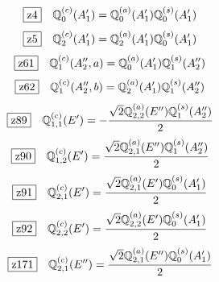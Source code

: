 \documentclass[fleqn,10pt,landscape]{jsarticle}
\begin{document}
\begin{dmath*}
\hspace*{3mm}\fbox{z4}\quad \mathbb{Q}_{0}^{(c)}(A_{1}^{\prime})=\mathbb{Q}_{0}^{(a)}(A_{1}^{\prime}) \mathbb{Q}_{0}^{(s)}(A_{1}^{\prime})
\end{dmath*}
\begin{dmath*}
\hspace*{3mm}\fbox{z5}\quad \mathbb{Q}_{2}^{(c)}(A_{1}^{\prime})=\mathbb{Q}_{2}^{(a)}(A_{1}^{\prime}) \mathbb{Q}_{0}^{(s)}(A_{1}^{\prime})
\end{dmath*}
\begin{dmath*}
\hspace*{3mm}\fbox{z61}\quad \mathbb{Q}_{1}^{(c)}(A_{2}^{\prime\prime},a)=\mathbb{Q}_{0}^{(a)}(A_{1}^{\prime}) \mathbb{Q}_{1}^{(s)}(A_{2}^{\prime\prime})
\end{dmath*}
\begin{dmath*}
\hspace*{3mm}\fbox{z62}\quad \mathbb{Q}_{1}^{(c)}(A_{2}^{\prime\prime},b)=\mathbb{Q}_{2}^{(a)}(A_{1}^{\prime}) \mathbb{Q}_{1}^{(s)}(A_{2}^{\prime\prime})
\end{dmath*}
\begin{dmath*}
\hspace*{3mm}\fbox{z89}\quad \mathbb{Q}_{1,1}^{(c)}(E^{\prime})=- \frac{\sqrt{2} \mathbb{Q}_{2,2}^{(a)}(E^{\prime\prime}) \mathbb{Q}_{1}^{(s)}(A_{2}^{\prime\prime})}{2}
\end{dmath*}
\begin{dmath*}
\hspace*{3mm}\fbox{z90}\quad \mathbb{Q}_{1,2}^{(c)}(E^{\prime})=\frac{\sqrt{2} \mathbb{Q}_{2,1}^{(a)}(E^{\prime\prime}) \mathbb{Q}_{1}^{(s)}(A_{2}^{\prime\prime})}{2}
\end{dmath*}
\begin{dmath*}
\hspace*{3mm}\fbox{z91}\quad \mathbb{Q}_{2,1}^{(c)}(E^{\prime})=\frac{\sqrt{2} \mathbb{Q}_{2,1}^{(a)}(E^{\prime}) \mathbb{Q}_{0}^{(s)}(A_{1}^{\prime})}{2}
\end{dmath*}
\begin{dmath*}
\hspace*{3mm}\fbox{z92}\quad \mathbb{Q}_{2,2}^{(c)}(E^{\prime})=\frac{\sqrt{2} \mathbb{Q}_{2,2}^{(a)}(E^{\prime}) \mathbb{Q}_{0}^{(s)}(A_{1}^{\prime})}{2}
\end{dmath*}
\begin{dmath*}
\hspace*{3mm}\fbox{z171}\quad \mathbb{Q}_{2,1}^{(c)}(E^{\prime\prime})=\frac{\sqrt{2} \mathbb{Q}_{2,1}^{(a)}(E^{\prime\prime}) \mathbb{Q}_{0}^{(s)}(A_{1}^{\prime})}{2}
\end{dmath*}
\end{document}
